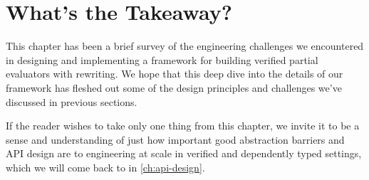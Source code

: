 \section{What's the Takeaway?}
This chapter has been a brief survey of the engineering challenges we encountered in designing and implementing a framework for building verified partial evaluators with rewriting.
We hope that this deep dive into the details of our framework has fleshed out some of the design principles and challenges we've discussed in previous sections.

If the reader wishes to take only one thing from this chapter, we invite it to be a sense and understanding of just how important good abstraction barriers and API design are to engineering at scale in verified and dependently typed settings, which we will come back to in \autoref{ch:api-design}.

\begin{comment}
\clearpage

\todo{mention frowned-upon Perl scripts previously in BoringSSL(?) OpenSSL?; (ask Andres for reference?)} Perl scripts were complicated, a number of steps removed from actual running code, hard to maintain and verify.
\todo{Refer back to representation changes (good abstraction barriers / equivalences) being important in fiat-crypto, and being cheap only because we have a rewriter}
\setlistdepth{20}
\renewlist{itemize}{itemize}{20}%
\setlist[itemize,1]{label=\textbullet}%
\setlist[itemize,2]{label=\normalfont \bfseries \textendash}%
\setlist[itemize,3]{label=\textasteriskcentered}%
\setlist[itemize,4]{label=\textperiodcentered}%
\setlist[itemize,5]{label=\textbullet}%
\setlist[itemize,6]{label=\normalfont \bfseries \textendash}%
\setlist[itemize,7]{label=\textasteriskcentered}%
\setlist[itemize,8]{label=\textperiodcentered}%
\setlist[itemize,9]{label=\textbullet}%
\setlist[itemize,10]{label=\normalfont \bfseries \textendash}%
\setlist[itemize,11]{label=\textasteriskcentered}%
\setlist[itemize,12]{label=\textperiodcentered}%
\setlist[itemize,13]{label=\textbullet}%
\setlist[itemize,14]{label=\normalfont \bfseries \textendash}%
\setlist[itemize,15]{label=\textasteriskcentered}%
\setlist[itemize,16]{label=\textperiodcentered}%
\setlist[itemize,17]{label=\textbullet}%
\setlist[itemize,18]{label=\normalfont \bfseries \textendash}%
\setlist[itemize,19]{label=\textasteriskcentered}%
\setlist[itemize,20]{label=\textperiodcentered}%


\end{comment}
%
